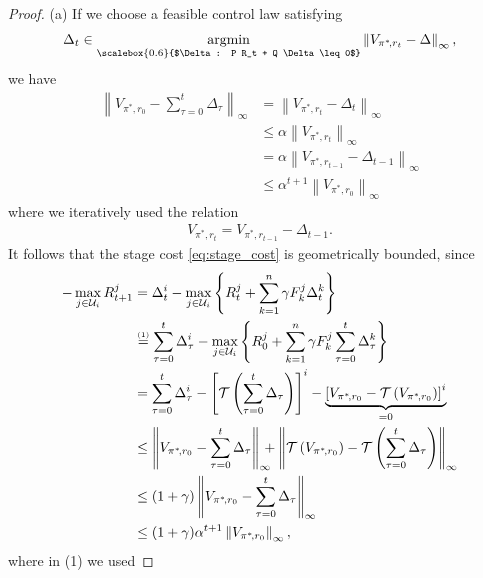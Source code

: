 \documentclass[10pt,leqno]{amsart}
\newcommand{\stkrl}[2]{\stackrel{\text{\tiny{(#1)}}}{#2}}
\newcommand{\norm}[1]{\left \|#1 \right \|}
\newcommand{\argmin}{\mathop{\rm argmin}}
\newcommand{\U}{\mathcal{U}}
\newcommand{\cost}{r}
\newcommand{\Vsym}{V}
\newcommand{\Varg}[1]{\Vsym_{#1}}
\newcommand{\Cost}{R}
\newcommand{\F}{F}
\newcommand{\policy}{\pi}
\newcommand{\disc}{\gamma}
\newcommand{\infnorm}[1]{\norm{#1}_\infty}
\begin{document}
\begin{proof}
    (a) If we choose a feasible control law satisfying
    \begin{align*}
        \Delta_t \in \argmin_{\scalebox{0.6}{$\Delta : P \Cost_t + Q \Delta \leq 0$}} \infnorm{\Varg{\policy^*\!, \cost_t} - \Delta},
    \end{align*}
    we have
    \begin{align*}
        \infnorm{\Varg{\policy^*\!, \cost_0} - \sum_{\tau = 0}^t \Delta_\tau} &= \infnorm{\Varg{\policy^*\!, \cost_t} - \Delta_t}\\
        &\leq \alpha \infnorm{\Varg{\policy^*\!, \cost_t}}\\
        &= \alpha \infnorm{\Varg{\policy^*\!, \cost_{t-1}} - \Delta_{t-1}}\\
        &\leq \alpha^{t + 1} \infnorm{\Varg{\policy^*\!, \cost_0}}
    \end{align*}
    where we iteratively used the relation
    \begin{align*}
        \Varg{\policy^*\!, \cost_t} = \Varg{\policy^*\!, \cost_{t-1}} - \Delta_{t-1}.
    \end{align*}
    It follows that the stage cost \eqref{eq:stage_cost} is geometrically bounded, since
    \begin{align*}
        -\max_{j \in \U_i} \Cost_{t+1}^j &= \Delta_t^i - \max_{j \in \U_i}\left\{ \Cost_t^j + \sum_{k = 1}^n \disc \F_k^j \Delta_t^k \right\}\\
        &\stkrl{1}{=} \sum_{\tau = 0}^t \Delta_\tau^i - \max_{j \in \U_i}\left\{ \Cost_0^j + \sum_{k = 1}^n \disc \F_k^j \sum_{\tau = 0}^t \Delta_\tau^k \right\}\\
        &= \sum_{\tau = 0}^t \Delta_\tau^i - \left[\mathcal{T}\left(\sum_{\tau = 0}^t \Delta_\tau\right)\right]^i - \underbrace{\left[\Varg{\policy^*\!, \cost_0} - \mathcal{T}\left( \Varg{\policy^*\!, \cost_0} \right) \right]^i}_{= 0}\\
        &\leq \infnorm{\Varg{\policy^*\!, \cost_0} - \sum_{\tau = 0}^t \Delta_\tau} \hspace{-0.25cm}+ \infnorm{\mathcal{T}\left( \Varg{\policy^*\!, \cost_0} \right) - \mathcal{T}\left(\sum_{\tau = 0}^t \Delta_\tau\right)}\\
        &\leq (1 + \disc) \infnorm{\Varg{\policy^*\!, \cost_0} - \sum_{\tau = 0}^t \Delta_\tau}\\
        &\leq (1 + \disc) \alpha^{t + 1} \infnorm{\Varg{\policy^*\!, \cost_0}},
    \end{align*}
    where in (1) we used 

\end{proof}
\end{document}
